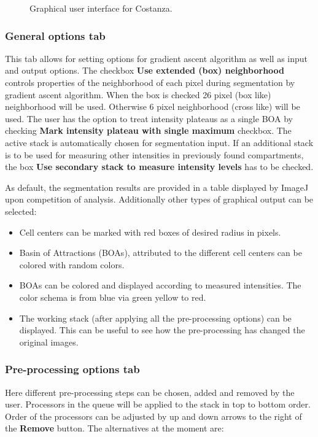 \documentclass[a4paper,12pt]{article}
\begin{document}
\begin{figure}[h!]
\begin{center}
\caption{Graphical user interface for Costanza.}
\label{fig:gui}
\end{center}
\end{figure}
%

\subsubsection{General options tab}
\label{sec:general}
This tab allows for setting options for gradient ascent algorithm as well as
input and output options.  The checkbox \textbf{Use extended (box)
neighborhood} controls properties of the neighborhood of each pixel during
segmentation by gradient ascent algorithm. When the box is checked 26 pixel
(box like) neighborhood will be used. Otherwise 6 pixel neighborhood (cross
like) will be used.  The user has the option to treat intensity plateaus as a
single BOA by checking \textbf{Mark intensity plateau with single maximum}
checkbox.  The active stack is automatically chosen for segmentation input. If
an additional stack is to be used for measuring other intensities in
previously found compartments, the box \textbf{Use secondary stack to measure
intensity levels} has to be checked.

As default, the segmentation results are provided in a table displayed by
ImageJ upon competition of analysis. Additionally other types of graphical output can be selected:

\begin{itemize}
%
\item Cell centers can be marked with red boxes of desired radius in pixels.
%
\item Basin of Attractions (BOAs), attributed to the different cell centers can be
	colored with random colors.
%
\item BOAs can be colored and displayed according to measured intensities. The color schema is from blue via green yellow to red.
%
\item The working stack (after applying all the pre-processing options) can be displayed. This can be useful to see how the
	pre-processing has changed the original images.
%
\end{itemize}

\subsubsection{Pre-processing options tab}
Here different pre-processing steps can be chosen, added and removed by the
user. Processors in the queue will be applied to the stack in top to bottom order. Order of the processors can be adjusted by up and down arrows to the right of the \textbf{Remove} button. The alternatives at the moment are:
\end{document}
